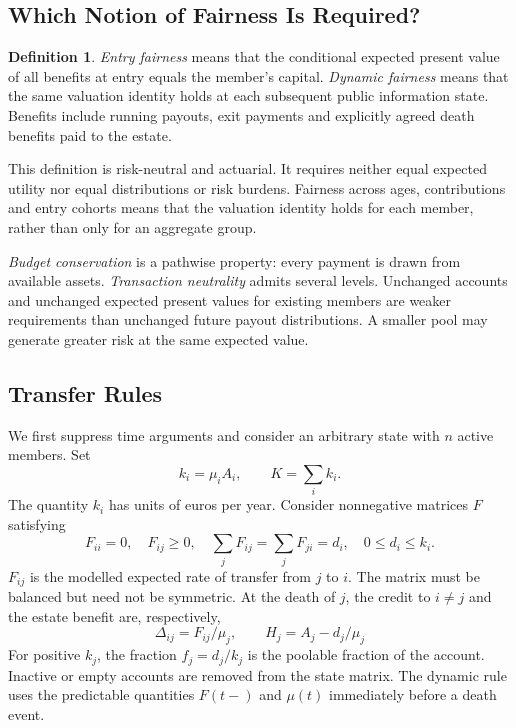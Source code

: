 \documentclass[11pt,a4paper]{article}
\theoremstyle{definition}\newtheorem{definition}[theorem]{Definition}
\theoremstyle{remark}\newtheorem{remark}[theorem]{Remark}
\begin{document}
\subsection{Which Notion of Fairness Is Required?}
\begin{definition}
\emph{Entry fairness} means that the conditional expected present value of all benefits at entry equals the member's capital. \emph{Dynamic fairness} means that the same valuation identity holds at each subsequent public information state. Benefits include running payouts, exit payments and explicitly agreed death benefits paid to the estate.
\end{definition}
This definition is risk-neutral and actuarial. It requires neither equal expected utility nor equal distributions or risk burdens. Fairness across ages, contributions and entry cohorts means that the valuation identity holds for each member, rather than only for an aggregate group.

\emph{Budget conservation} is a pathwise property: every payment is drawn from available assets. \emph{Transaction neutrality} admits several levels. Unchanged accounts and unchanged expected present values for existing members are weaker requirements than unchanged future payout distributions. A smaller pool may generate greater risk at the same expected value.

\subsection{Transfer Rules}
We first suppress time arguments and consider an arbitrary state with $n$ active members. Set
\[
k_i=\mu_iA_i,\qquad K=\sum_i k_i.
\]
The quantity $k_i$ has units of euros per year. Consider nonnegative matrices $F$ satisfying
\begin{equation}\label{eq:balanced}
F_{ii}=0,\quad F_{ij}\ge0,\quad
\sum_jF_{ij}=\sum_jF_{ji}=d_i,\quad 0\le d_i\le k_i.
\end{equation}
$F_{ij}$ is the modelled expected rate of transfer from $j$ to $i$. The matrix must be balanced but need not be symmetric. At the death of $j$, the credit to $i\ne j$ and the estate benefit are, respectively,
\begin{equation}\label{eq:transfer}
\Delta_{ij}=F_{ij}/\mu_j,
\qquad H_j=A_j-d_j/\mu_j
\end{equation}
For positive $k_j$, the fraction $f_j=d_j/k_j$ is the poolable fraction of the account. Inactive or empty accounts are removed from the state matrix. The dynamic rule uses the predictable quantities $F(t-)$ and $\mu(t)$ immediately before a death event.
\end{document}
